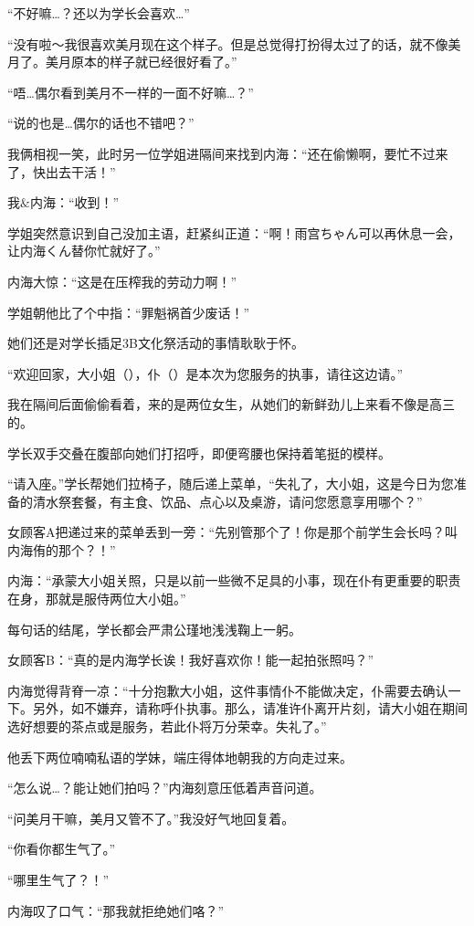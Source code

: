 “不好嘛…？还以为学长会喜欢…”

“没有啦～我很喜欢美月现在这个样子。但是总觉得打扮得太过了的话，就不像美月了。美月原本的样子就已经很好看了。”

“唔…偶尔看到美月不一样的一面不好嘛…？”

“说的也是…偶尔的话也不错吧？”

我俩相视一笑，此时另一位学姐进隔间来找到内海：“还在偷懒啊，要忙不过来了，快出去干活！”

我$\&$内海：“收到！”

学姐突然意识到自己没加主语，赶紧纠正道：“啊！雨宫ちゃん可以再休息一会，让内海くん替你忙就好了。”

内海大惊：“这是在压榨我的劳动力啊！”

学姐朝他比了个中指：“罪魁祸首少废话！”

她们还是对学长插足3B文化祭活动的事情耿耿于怀。

“欢迎回家，大小姐（），仆（）是本次为您服务的执事，请往这边请。”

我在隔间后面偷偷看着，来的是两位女生，从她们的新鲜劲儿上来看不像是高三的。

学长双手交叠在腹部向她们打招呼，即便弯腰也保持着笔挺的模样。

“请入座。”学长帮她们拉椅子，随后递上菜单，“失礼了，大小姐，这是今日为您准备的清水祭套餐，有主食、饮品、点心以及桌游，请问您愿意享用哪个？”

女顾客A把递过来的菜单丢到一旁：“先别管那个了！你是那个前学生会长吗？叫内海侑的那个？！”

内海：“承蒙大小姐关照，只是以前一些微不足具的小事，现在仆有更重要的职责在身，那就是服侍两位大小姐。”

每句话的结尾，学长都会严肃公瑾地浅浅鞠上一躬。

女顾客B：“真的是内海学长诶！我好喜欢你！能一起拍张照吗？”

内海觉得背脊一凉：“十分抱歉大小姐，这件事情仆不能做决定，仆需要去确认一下。另外，如不嫌弃，请称呼仆执事。那么，请准许仆离开片刻，请大小姐在期间选好想要的茶点或是服务，若此仆将万分荣幸。失礼了。”

他丢下两位喃喃私语的学妹，端庄得体地朝我的方向走过来。

“怎么说…？能让她们拍吗？”内海刻意压低着声音问道。

“问美月干嘛，美月又管不了。”我没好气地回复着。

“你看你都生气了。”

“哪里生气了？！”

内海叹了口气：“那我就拒绝她们咯？”

